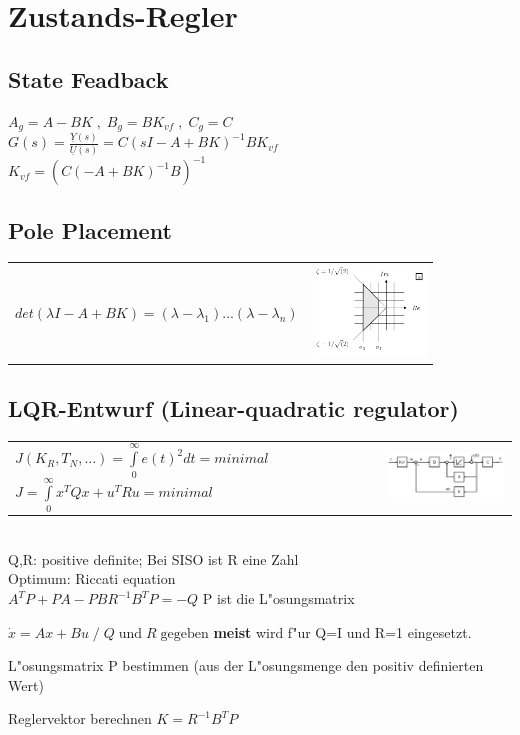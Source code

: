 \section{Zustands-Regler}
\subsection{State Feadback}

$A_g = A-BK \; , \; B_g = BK_{vf} \; , \; C_g = C $\\
$G(s) = \frac{\underline{Y}(s)}{\underline{U}(s)} = C(sI-A+BK)^{-1}BK_{vf}$\\
$K_{vf} = (C(-A+BK)^{-1}B)^{-1}$

\subsection{Pole Placement}

\begin{tabular}{ll}
	\parbox{8cm}{$det(\lambda I-A+BK) = (\lambda - \lambda_1)...(\lambda - \lambda_n)$} &
	\parbox{3cm}{\includegraphics[width=3cm]{./bilder/pole_locations.png}}
\end{tabular}

\newpage

\subsection{LQR-Entwurf (Linear-quadratic regulator)}
	\begin{tabular}{ll}
		\parbox{6cm}{	$J(K_R,T_N,\ldots)=\int\limits^{\infty}_0 e(t)^2 dt = minimal$\\
						$J=\int\limits_0^{\infty} {x^T Q x+u^T R u}= minimal$\\}&
		\parbox{6cm}{\includegraphics[width=6cm]{./bilder/statereg.png}}
	\end{tabular}\\	
	Q,R: positive definite; Bei SISO ist R eine Zahl\\
	Optimum: Riccati equation\\
	$ A^T P + P A - P B R^{-1} B^T P = -Q$ \hspace{2cm}
	P ist die L"osungsmatrix
	\begin{aufzaehlung}
    	\item $\dot{x} = Ax + Bu \; / \;  Q \; \text{und} \; R \; \text{gegeben}$
    	\textbf{meist} wird f"ur Q=I und R=1 eingesetzt.
    	\item L"osungsmatrix P bestimmen (aus der L"osungsmenge den positiv
    	definierten Wert)
    	\item Reglervektor berechnen $K=R^{-1} B^T P$
    \end{aufzaehlung}

